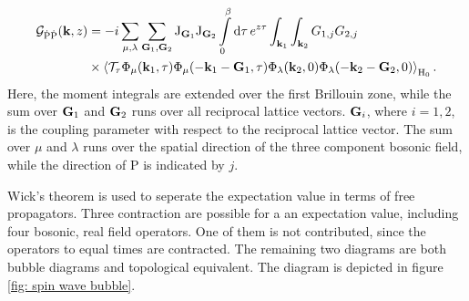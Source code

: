 %
\begin{align}
	\mathcal{G}_{\dot{\mathrm{P}}\dot{\mathrm{P}}}(\vb{k}, z) &= 
		-i 
		\sum\limits_{\mu, \lambda}
		\sum\limits_{\vb{G}_{1}, \vb{G}_{2}} 
		\mathrm{J}_{\vb{G}_{1}} \mathrm{J}_{\vb{G}_{2}} 
		\int\limits_{0}^{\beta} \dd{\tau} e^{z \tau} 
		\int_{\vb{k}_{1}}\int_{\vb{k}_{2}} G_{1,j}  G_{2,j} 
		\notag \\
		&\times
		\expval{\mathcal{T}_{\tau} \Phi_{\mu}(\vb{k}_{1},\tau) \Phi_{\mu}(-\vb{k}_{1} - \vb{G}_{1},\tau) \Phi_{\lambda}(\vb{k}_{2},0) \Phi_{\lambda}(-\vb{k}_{2} - \vb{G}_{2},0)}_{\mathrm{H}_{0}}.
\end{align}
%
Here, the moment integrals are extended over the first Brillouin zone, while the sum over $\vb{G}_{1}$ and $\vb{G}_{2}$ runs over all reciprocal lattice vectors.
$\vb{G}_{i}$, where $i=1,2$, is the coupling parameter with respect to the reciprocal lattice vector.
The sum over $\mu$ and $\lambda$ runs over the spatial direction of the three component bosonic field, while the direction of P is indicated by $j$.

Wick's theorem is used to seperate the expectation value in terms of free propagators.
Three contraction are possible for a an expectation value, including four bosonic, real field operators.
One of them is not contributed, since the operators to equal times are contracted.
The remaining two diagrams are both bubble diagrams and topological equivalent.
The diagram is depicted in figure \ref{fig: spin wave bubble}.

